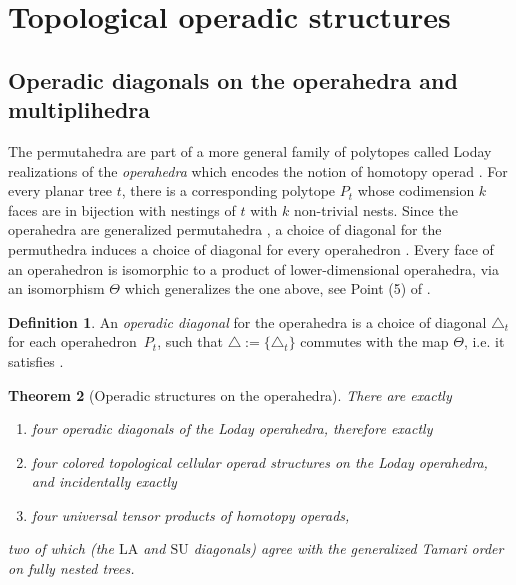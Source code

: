 \documentclass{amsart}
\newtheorem{theorem}{Theorem}[section]
\theoremstyle{definition}
\newtheorem{definition}[theorem]{Definition}
\newcommand{\SU}{\mathrm{SU}}
\newcommand{\LA}{\mathrm{LA}}
\begin{document}
\section{Topological operadic structures}


\subsection{Operadic diagonals on the operahedra and multiplihedra}

The permutahedra are part of a more general family of polytopes called Loday realizations of the \emph{operahedra} \cite[Def. 2.9]{LA21} which encodes the notion of homotopy operad \cite[Def. 4.11]{LA21}.
For every planar tree $t$, there is a corresponding polytope $P_t$ whose codimension $k$ faces are in bijection with nestings of $t$ with $k$ non-trivial nests.
Since the operahedra are generalized permutahedra \cite[Cor. 2.16]{LA21}, a choice of diagonal for the permuthedra induces a choice of diagonal for every operahedron \cite[Cor. 1.31]{LA21}.
Every face of an operahedron is isomorphic to a product of lower-dimensional operahedra, via an isomorphism $\Theta$ which generalizes the one above, see Point (5) of \cite[Prop. 2.3]{LA21}.

\begin{definition}
    An \emph{operadic diagonal} for the operahedra is a choice of diagonal $\triangle_t$ for each operahedron~$P_t$, such that $\triangle:=\{\triangle_t\}$ commutes with the map $\Theta$, i.e. it satisfies \cite[Prop. 4.14]{LA21}.
\end{definition}

\begin{theorem}[Operadic structures on the operahedra] 
    \label{thm:operahedra}
There are exactly 
\begin{enumerate}
    \item four operadic diagonals of the Loday operahedra, therefore exactly
    \item four colored topological cellular operad structures on the Loday operahedra, and incidentally exactly
    \item four universal tensor products of homotopy operads,
\end{enumerate}
two of which (the $\LA$ and $\SU$ diagonals) agree with the generalized Tamari order on fully nested trees. 
\end{theorem}
\end{document}
